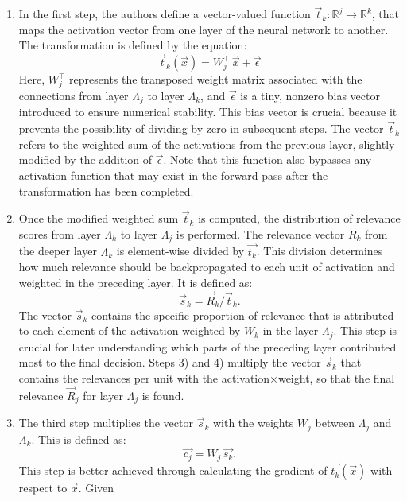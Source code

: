 \begin{enumerate}
    \item In the first step, the authors define a vector-valued function $\vec{t}_k:\mathbb{R}^j\to\mathbb{R}^k$, that maps the activation vector from one layer of the neural network to another. The transformation is defined by the equation:
\begin{equation*}
    \vec{t}_k(\vec{x}) = W_j^\intercal\, \vec{x} + \vec{\epsilon}
\end{equation*}
   Here, $W_j^\intercal$ represents the transposed weight matrix associated with the connections from layer $\Lambda_j$ to layer $\Lambda_k$, and $\vec{\epsilon}$ is a tiny, nonzero bias vector introduced to ensure numerical stability. This bias vector is crucial because it prevents the possibility of dividing by zero in subsequent steps. The vector $\vec{t}_k$ refers to the weighted sum of the activations from the previous layer, slightly modified by the addition of $\vec{\epsilon}$. Note that this function also bypasses any activation function that may exist in the forward pass after the transformation has been completed.
   \item Once the modified weighted sum $\vec{t}_k$ is computed, the distribution of relevance scores from layer $\Lambda_k$ to layer $\Lambda_j$ is performed. The relevance vector $R_k$ from the deeper layer $\Lambda_k$ is element-wise divided by $\vec{t_k}$. This division determines how much relevance should be backpropagated to each unit of activation and weighted in the preceding layer. It is defined as:
\begin{equation*}
   \vec{s}_k = \vec{R}_k / \vec{t}_k.
\end{equation*} 
   The vector $\vec{s}_k$ contains the specific proportion of relevance that is attributed to each element of the activation weighted by $W_k$ in the layer $\Lambda_j$. This step is crucial for later understanding which parts of the preceding layer contributed most to the final decision.
   Steps 3) and 4) multiply the vector $\vec{s}_k$ that contains the relevances per unit with the activation$\times$weight, so that the final relevance $\vec{R}_j$ for layer $\Lambda_j$ is found.
   \item The third step multiplies the vector $\vec{s}_k$ with the weights $W_j$ between $\Lambda_j$ and $\Lambda_k$. This is defined as: 
\begin{equation*}
   \vec{c_{j}} =  W_j\, \vec{s_{k}}.
\end{equation*} 
This step is better achieved through calculating the gradient of \(\vec{t_{k}}(\vec{x})\) with respect to \(\vec{x}\). Given 

\end{enumerate}
